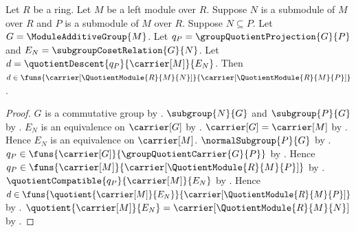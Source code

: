 \begin{proposition}\label{module_quotient_comparison_type}
    Let $R$ be a ring.
    Let $M$ be a left module over $R$.
    Suppose $N$ is a submodule of $M$ over $R$ and
        $P$ is a submodule of $M$ over $R$.
    Suppose $N\subseteq P$.
    Let $G=\ModuleAdditiveGroup{M}$.
    Let $q_P=\groupQuotientProjection{G}{P}$ and
        $E_N=\subgroupCosetRelation{G}{N}$.
    Let $d=\quotientDescent{q_P}{\carrier[M]}{E_N}$.
    Then $d\in\funs{\carrier[\QuotientModule{R}{M}{N}]}{
        \carrier[\QuotientModule{R}{M}{P}]}$.
\end{proposition}
\begin{proof}
    $G$ is a commutative group by
        .
    $\subgroup{N}{G}$ and $\subgroup{P}{G}$ by
        .
    $E_N$ is an equivalence on $\carrier[G]$ by
        .
    $\carrier[G]=\carrier[M]$ by
        .
    Hence $E_N$ is an equivalence on $\carrier[M]$.
    $\normalSubgroup{P}{G}$ by
        .
    $q_P\in\funs{\carrier[G]}{\groupQuotientCarrier{G}{P}}$ by
        .
    Hence $q_P\in\funs{\carrier[M]}{
        \carrier[\QuotientModule{R}{M}{P}]}$ by
        .
    $\quotientCompatible{q_P}{\carrier[M]}{E_N}$ by
        .
    Hence $d\in\funs{\quotient{\carrier[M]}{E_N}}{
        \carrier[\QuotientModule{R}{M}{P}]}$ by
        .
    $\quotient{\carrier[M]}{E_N}
        =\carrier[\QuotientModule{R}{M}{N}]$ by
        .
\end{proof}

